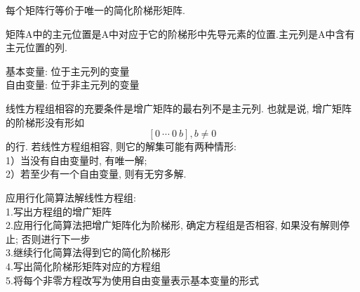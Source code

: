 \begin{theorem}[简化阶梯形矩阵的唯一性]
每个矩阵行等价于唯一的简化阶梯形矩阵.
\end{theorem}\vspace{2ex}

\begin{definition}
矩阵A中的{\heiti 主元位置}是A中对应于它的阶梯形中先导元素的位置.{\heiti 主元列}是A中含有主元位置的列.
\end{definition}\vspace{2ex}

基本变量: 位于主元列的变量\\
自由变量: 位于非主元列的变量\\[2ex]

\begin{theorem}[存在与唯一性定理]
线性方程组相容的充要条件是增广矩阵的最右列不是主元列. 也就是说, 增广矩阵的阶梯形没有形如
	\[[0\ \cdots\ 0\ b], b\neq 0\]
的行. 若线性方程组相容, 则它的解集可能有两种情形:\\
1）当没有自由变量时, 有唯一解;\\
2）若至少有一个自由变量, 则有无穷多解.
\end{theorem}\vspace{2ex}

应用行化简算法解线性方程组:\\
1.写出方程组的增广矩阵\\
2.应用行化简算法把增广矩阵化为阶梯形, 确定方程组是否相容, 如果没有解则停止; 否则进行下一步\\
3.继续行化简算法得到它的简化阶梯形\\
4.写出简化阶梯形矩阵对应的方程组\\
5.将每个非零方程改写为使用自由变量表示基本变量的形式\\[4ex]

